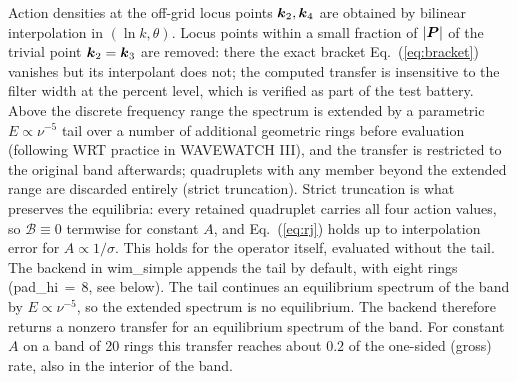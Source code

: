 \documentclass[12pt]{article}
\newcommand{\eq }  [1]{Eq.~(\ref{#1})}  %
\renewcommand{\v}[1]{{\mbox{\boldmath$ #1 $}}}  %
\begin{document}
Action densities at the off-grid locus points $\v k_2, \v k_4$ are obtained
by bilinear interpolation in $(\ln k, \theta)$.
Locus points within a small fraction of $|\v P|$ of the trivial point
$\v k_2 = \v k_3$ are removed: there the exact bracket \eq{eq:bracket}
vanishes but its interpolant does not; the computed transfer is insensitive
to the filter width at the percent level, which is verified as part of the
test battery.
Above the discrete frequency range the spectrum is extended by a parametric
$E \propto \nu^{-5}$ tail over a number of additional geometric rings before
evaluation (following WRT practice in WAVEWATCH III), and the transfer is
restricted to the original band afterwards; quadruplets with any member
beyond the extended range are discarded entirely (strict truncation).
Strict truncation is what preserves the equilibria: every retained quadruplet
carries all four action values, so $\mathcal{B} \equiv 0$ termwise for
constant $A$, and \eq{eq:rj} holds up to interpolation error for
$A \propto 1/\sigma$.
This holds for the operator itself, evaluated without the tail.
The backend in wim\_simple appends the tail by default, with eight rings
(pad\_hi$\,=\,$8, see below).
The tail continues an equilibrium spectrum of the band by
$E \propto \nu^{-5}$, so the extended spectrum is no equilibrium.
The backend therefore returns a nonzero transfer for an equilibrium
spectrum of the band.
For constant $A$ on a band of 20 rings this transfer reaches about $0.2$ of
the one-sided (gross) rate, also in the interior of the band.
\end{document}
